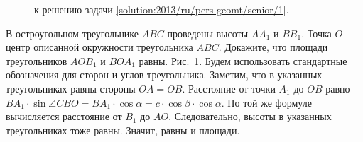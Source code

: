 \ifsolution
\begin{figure}\centering
    \caption{к решению задачи \ref{solution:2013/ru/pers-geomt/senior/1}.}
    \label{fig:solution:2013/ru/pers-geomt/senior/1}
\end{figure}
\fi %

\problem
В остроугольном треугольнике $ABC$ проведены высоты $A A_1$ и $B B_1$.
Точка $O$~--- центр описанной окружности треугольника $ABC$.
Докажите, что площади треугольников $A O B_1$ и $B O A_1$ равны.
\solution
\label{solution:2013/ru/pers-geomt/senior/1}
Рис.~\ref{fig:solution:2013/ru/pers-geomt/senior/1}.
Будем использовать стандартные обозначения для сторон и углов треугольника.
Заметим, что в указанных треугольниках равны стороны $OA = OB$.
Расстояние от точки $A_1$ до $OB$ равно
\(
    B A_1 \cdot \sin \angle CBO
=
    B A_1 \cdot \cos \alpha
=
    c \cdot \cos \beta \cdot \cos \alpha
\).
По той же формуле вычисляется расстояние от $B_1$ до $AO$.
Следовательно, высоты в указанных треугольниках тоже равны.
Значит, равны и площади.
\endproblem
